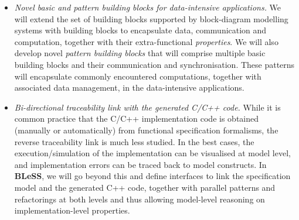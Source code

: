 \documentclass[a4paper,11pt]{article}
\newcommand{\project}[1]{\textbf{#1}\xspace}
\newcommand{\BLESS}{\project{BLeSS}}
\newcommand{\TheProject}{\BLESS}
\begin{document}
\begin{itemize}

\item \textit{Novel basic and pattern building blocks for data-intensive applications.}
We will extend the set of building blocks supported by block-diagram modelling systems with building blocks to encapsulate data, communication and computation, together with their extra-functional \emph{properties}. We will also develop novel \emph{pattern building blocks} that will comprise multiple basic building blocks and their communication and synchronisation. These patterns will encapsulate commonly encountered computations, together with associated data management, in the data-intensive applications.


\item \textit{Bi-directional traceability link with the generated C/C++ code.}
  While it is common practice that the C/C++ implementation code is
  obtained (manually or automatically) from functional specification
  formalisms, the reverse traceability link is much less studied. In the
  best cases, the execution/simulation of the implementation can be
  visualised at model level, and implementation errors can be traced
  back to model constructs. In \TheProject, we will go beyond this
  and define interfaces to link the specification model and the 
  generated C++ code, together with parallel patterns and refactorings
  at both levels and thus allowing model-level reasoning on
  implementation-level properties.
  

\end{itemize}
\end{document}
